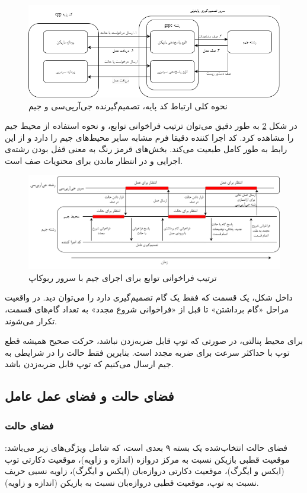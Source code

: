 \begin{figure}[H]
    \centering
    \includegraphics[width=1\textwidth]{images/grpc_gym.png}
    \caption{نحوه کلی ارتباط کد پایه، تصمیم‌گیرنده جی‌آر‌پی‌سی و جیم}\label{fig:gym_grpc}
\end{figure}
در شکل \ref{fig:gym_timing}
به طور دقیق می‌توان ترتیب فراخوانی توابع، و نحوه استفاده از محیط جیم را مشاهده کرد.
کد اجرا کننده
دقیقا فرم مشابه سایر محیط‌های جیم را دارد و از این رابط به طور کامل طبعیت می‌کند.
بخش‌های قرمز رنگ به معنی قفل بودن رشته‌ی اجرایی و در انتظار ماندن برای محتویات صف است.
\begin{figure}[H]
    \centering
    \includegraphics[width=1\textwidth]{images/timing.png}
    \caption{ترتیب فراخوانی توابع برای اجرای جیم با سرور ربوکاپ}\label{fig:gym_timing}
\end{figure}

داخل شکل، یک قسمت که فقط یک گام تصمیم‌گیری دارد را می‌توان دید. در واقعیت مراحل «گام برداشتن» تا قبل از «فراخوانی شروع مجدد» به تعداد گام‌های قسمت، تکرار می‌شوند.

برای محیط پنالتی، در صورتی که توپ قابل ضربه‌زدن نباشد، حرکت صحیح همیشه قطع توپ با حداکثر سرعت برای ضربه مجدد است. بنابرین فقط حالت را در شرایطی به جیم ارسال می‌کنیم که توپ قابل ضربه‌زدن باشد.
\subsection{فضای حالت و فضای عمل عامل}
\subsubsection{فضای حالت}
فضای حالت انتخاب‌شده یک بسته ۹ بعدی است، که شامل ویژگی‌های زیر می‌باشد: موقعیت قطبی بازیکن نسبت به مرکز دروازه (اندازه و زاویه)،
موقعیت دکارتی توپ‌ (ایکس و ایگرگ)،
موقعیت دکارتی دروازه‌بان (ایکس و ایگرگ)،
زاویه نسبی حریف نسبت به توپ،
موقعیت قطبی دروازه‌بان نسبت به بازیکن (اندازه و زاویه).

